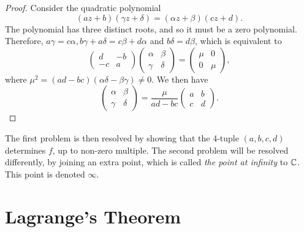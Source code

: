 \documentclass[main.tex]{subfiles}
\begin{document}
		\begin{proof}
			Consider the quadratic polynomial
			\begin{equation*}
				(az + b)(\gamma z + \delta) = (\alpha z + \beta)(cz + d).
			\end{equation*}
			The polynomial has three distinct roots, and so it must be a zero polynomial. Therefore, $a\gamma = c\alpha, b\gamma + a \delta = c\beta + d\alpha$ and $b\delta = d\beta$, which is equivalent to
			\begin{equation*}
				\begin{pmatrix}
					d & -b\\
					-c & a
				\end{pmatrix}
				\begin{pmatrix}
				\alpha & \beta \\
				\gamma & \delta
				\end{pmatrix}
				=
				\begin{pmatrix}
					\mu		&	0\\
					0		& \mu
				\end{pmatrix},
			\end{equation*}
			where $\mu^2 = {(ad - bc)}{(\alpha\delta - \beta\gamma)}{ \neq 0}$. We then have
			\begin{equation*}
				\begin{pmatrix}
				\alpha & \beta \\
				\gamma & \delta
				\end{pmatrix}
				= \frac{\mu}{ad - bc}\begin{pmatrix}
				a & b \\
				c & d
				\end{pmatrix}.
			\end{equation*}%
		\end{proof}
		The first problem is then resolved by showing that the 4-tuple $(a,b,c,d)$ determines $f$, up to non-zero multiple. The second problem will be resolved differently, by joining an extra point, which is called \textit{the point at infinity} to $\mathbb C$. This point is denoted $\infty$.
	
	
		\section{Lagrange's Theorem}
\end{document}
